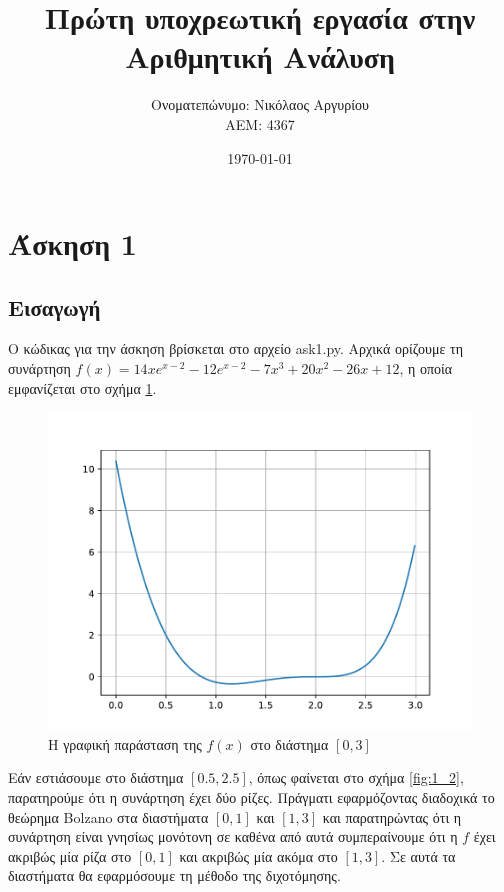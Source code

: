 \documentclass[a4paper,11pt]{article}
\title{Πρώτη υποχρεωτική εργασία στην Αριθμητική Ανάλυση}
\author{\gt Ονοματεπώνυμο: Νικόλαος Αργυρίου \\  ΑΕΜ: 4367}
\date{\today}
\newcommand{\lt}{\latintext}
\newcommand{\gt}{\greektext}
\begin{document}
\maketitle

\section{Άσκηση 1}
\subsection{Εισαγωγή}

Ο κώδικας για την άσκηση βρίσκεται στο αρχείο \lt ask1.py. \gt Αρχικά ορίζουμε τη συνάρτηση \lt \(f(x) = 14xe^{x-2}-12e^{x-2}-7x^3+20x^2-26x+12\), \gt η οποία εμφανίζεται στο σχήμα \ref{fig:1_1}.

\begin{figure}[h!]
    \centering
    \includegraphics[width=0.8\linewidth]{images/ask1_1.pdf}
    \centering
     \caption{Η γραφική παράσταση της \lt \(f(x)\) \gt στο διάστημα \([0, 3]\)}
    \label{fig:1_1}
\end{figure}

Εάν εστιάσουμε στο διάστημα \([0.5, 2.5]\), όπως φαίνεται στο σχήμα \ref{fig:1_2}, παρατηρούμε ότι η συνάρτηση έχει δύο ρίζες. Πράγματι εφαρμόζοντας διαδοχικά το θεώρημα \lt Bolzano \gt στα διαστήματα \([0, 1]\) και \([1, 3]\) και παρατηρώντας ότι η συνάρτηση είναι γνησίως μονότονη σε καθένα από αυτά συμπεραίνουμε ότι η \lt \(f\) \gt έχει ακριβώς μία ρίζα στο \([0, 1]\) και ακριβώς μία ακόμα στο \([1, 3]\). Σε αυτά τα διαστήματα θα εφαρμόσουμε τη μέθοδο της διχοτόμησης.
\end{document}

